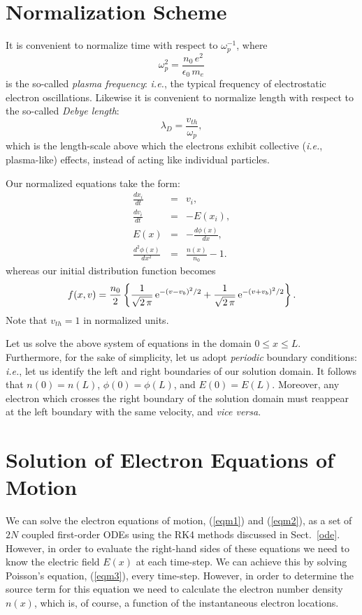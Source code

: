 \section{Normalization Scheme}
It is convenient to normalize time with respect to $\omega_p^{-1}$, where
\begin{equation}
\omega_p^2 = \frac{n_0\,e^2}{\epsilon_0\,m_e}
\end{equation}
is the  so-called {\em plasma frequency}: {\em i.e.}, the typical frequency of electrostatic electron oscillations. Likewise it is convenient to normalize length with respect to the so-called {\em Debye length}:
$$
\lambda_D = \frac{v_{th}}{\omega_p},
$$
which is the length-scale above which the electrons exhibit collective ({\em i.e.},
plasma-like) effects, instead of acting like individual particles.

Our normalized equations take the form:
\begin{eqnarray}
\frac{dx_i}{dt} &=&v_i,\label{eqm1}\\[0.5ex]
\frac{d v_i}{dt} &=& - E(x_i),\label{eqm2}\\[0.5ex]
E(x) &=& - \frac{d\phi(x)}{dx},\label{eqm4}\\[0.5ex]
\frac{d^2\phi(x)}{dx^2} &=& \frac{n(x)}{n_0}-1.\label{eqm3}
\end{eqnarray}
whereas our initial distribution function becomes
\begin{equation}
f(x,v) = \frac{n_0}{2}\left\{\frac{1}{\sqrt{2\,\pi}}
\,{\rm e}^{-(v-v_b)^2/2}+ \frac{1}{\sqrt{2\,\pi}}\,{\rm e}^{-(v+v_b)^2/2}
\right\}.
\end{equation}
Note that $v_{th}=1$ in normalized units.

Let us solve the above system of equations in the domain $0\leq x\leq L$. 
Furthermore, for the sake of simplicity, let us adopt {\em periodic} boundary conditions:
{\em i.e.}, let us identify the left and right boundaries of our solution domain.
It follows that $n(0)=n(L)$,  $\phi(0)=\phi(L)$, and $E(0) = E(L)$. Moreover, any electron
which crosses the right boundary of the solution domain must reappear at the left boundary with
the same velocity, and
{\em vice versa}.

\section{Solution of Electron Equations of Motion}
We can solve the electron equations of motion, (\ref{eqm1}) and (\ref{eqm2}), as a set
of $2N$ coupled first-order ODEs using the RK4 methods discussed in Sect.~\ref{ode}.
However, in order to evaluate the right-hand sides of these equations we need to know
the electric field $E(x)$  at each time-step.
We can achieve this by solving Poisson's equation, (\ref{eqm3}), every time-step.
However, in order to determine the source term for this equation we need to calculate the
electron number density $n(x)$, which is, of course, a function of the instantaneous
electron locations.

